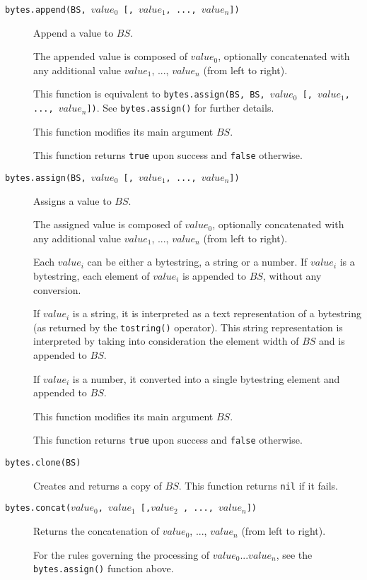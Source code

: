 \documentclass[11pt]{article}
\begin{document}
\begin{description}

\item[\texttt{bytes.append(BS, $value_0$ [, $value_1$, ..., $value_n$])}]
{
  Append a value to $BS$.

  The appended value is composed of $value_0$, optionally concatenated with
  any additional value $value_1$, ..., $value_n$ (from left to right).

  This function is equivalent to 
  \texttt{bytes.assign(BS, BS, $value_0$ [, $value_1$, ..., $value_n$])}.
  See \texttt{bytes.assign()} for further details.

  This function modifies its main argument $BS$.

  This function returns \texttt{true} upon success and \texttt{false} otherwise.
}

\item[\texttt{bytes.assign(BS, $value_0$ [, $value_1$, ..., $value_n$])}]
{
  Assigns a value to $BS$. 

  The assigned value is composed of $value_0$, optionally concatenated with 
  any additional value $value_1$, ..., $value_n$ (from left to right).

  Each $value_i$ can be either a bytestring, a string or a number.
  If $value_i$ is a bytestring, each element of $value_i$ is appended to $BS$, 
  without any conversion.

  If $value_i$ is a string, it is interpreted as a text representation of
  a bytestring (as returned by the \texttt{tostring()} operator). This string
  representation is interpreted by taking into consideration the element width 
  of $BS$ and is appended to $BS$.

  If $value_i$ is a number, it converted into a single bytestring element and 
  appended to $BS$.

  This function modifies its main argument $BS$.

  This function returns \texttt{true} upon success and \texttt{false} otherwise.
} 

\item[\texttt{bytes.clone(BS)}]
{
  Creates and returns a copy of $BS$.
  This function returns \texttt{nil} if it fails.
}

\item[\texttt{bytes.concat($value_0$, $value_1$ [,$value_2$ , ..., $value_n$])}]
{
  Returns the concatenation of $value_0$, ..., $value_n$ (from left to right).

  For the rules governing the processing of $value_0 ... value_n$, see
  the \texttt{bytes.assign()} function above.

}
\end{description}
\end{document}
